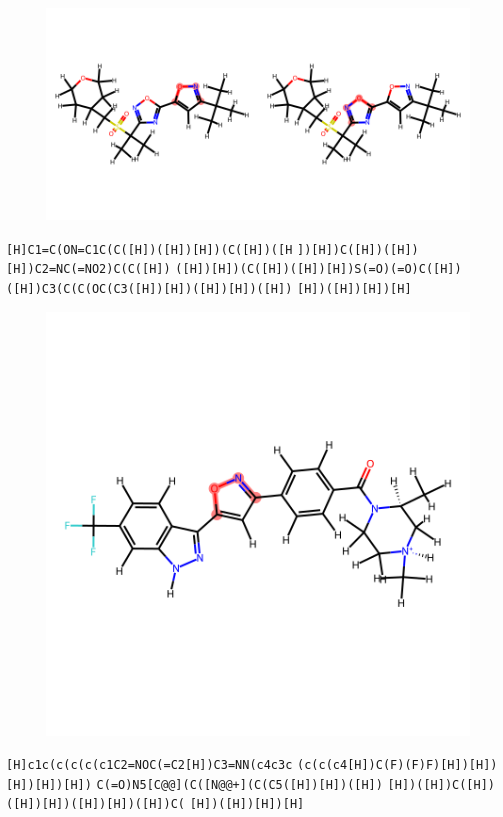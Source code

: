 \documentclass{article}
\begin{document}
\begin{figure}[ht]
\centering
    \includegraphics{mol176.png}
\end{figure}
\verb|[H]C1=C(ON=C1C(C([H])([H])[H])(C([H])([H| \verb|])[H])C([H])([H])[H])C2=NC(=NO2)C(C([H])| \verb|([H])[H])(C([H])([H])[H])S(=O)(=O)C([H])| \verb|([H])C3(C(C(OC(C3([H])[H])([H])[H])([H])| \verb|[H])([H])[H])[H]|

\begin{figure}[ht]
\centering
    \includegraphics{mol177.png}
\end{figure}
\verb|[H]c1c(c(c(c(c1C2=NOC(=C2[H])C3=NN(c4c3c| \verb|(c(c(c4[H])C(F)(F)F)[H])[H])[H])[H])[H])| \verb|C(=O)N5[C@@](C([N@@+](C(C5([H])[H])([H])| \verb|[H])([H])C([H])([H])[H])([H])[H])([H])C(| \verb|[H])([H])[H])[H]|
\end{document}
